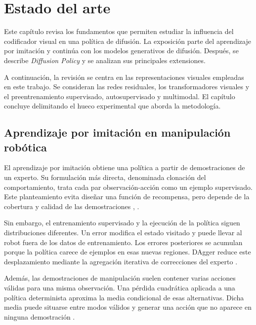 \chapter{Estado del arte}
\label{cap:estado-del-arte}

Este cap\'itulo revisa los fundamentos que permiten estudiar la influencia del
codificador visual en una pol\'itica de difusi\'on. La exposici\'on parte del
aprendizaje por imitaci\'on y contin\'ua con los modelos generativos de difusi\'on.
Despu\'es, se describe \textit{Diffusion Policy} y se analizan sus principales
extensiones.

A continuaci\'on, la revisi\'on se centra en las representaciones visuales empleadas
en este trabajo. Se consideran las redes residuales, los transformadores visuales y
el preentrenamiento supervisado, autosupervisado y multimodal. El cap\'itulo concluye
delimitando el hueco experimental que aborda la metodolog\'ia.

\section{Aprendizaje por imitaci\'on en manipulaci\'on rob\'otica}
\label{sec:imitacion}

El aprendizaje por imitaci\'on obtiene una pol\'itica a partir de demostraciones de un
experto. Su formulaci\'on m\'as directa, denominada clonaci\'on del comportamiento,
trata cada par observaci\'on-acci\'on como un ejemplo supervisado. Este planteamiento
evita dise\~nar una funci\'on de recompensa, pero depende de la cobertura y calidad de
las demostraciones \cite{ross2011dagger}, \cite{mandlekar2021robomimic}.

Sin embargo, el entrenamiento supervisado y la ejecuci\'on de la pol\'itica siguen
distribuciones diferentes. Un error modifica el estado visitado y puede llevar al
robot fuera de los datos de entrenamiento. Los errores posteriores se acumulan
porque la pol\'itica carece de ejemplos en esas nuevas regiones. DAgger reduce este
desplazamiento mediante la agregaci\'on iterativa de correcciones del experto
\cite{ross2011dagger}.

Adem\'as, las demostraciones de manipulaci\'on suelen contener varias acciones
v\'alidas para una misma observaci\'on. Una p\'erdida cuadr\'atica aplicada a una
pol\'itica determinista aproxima la media condicional de esas alternativas. Dicha
media puede situarse entre modos v\'alidos y generar una acci\'on que no aparece en
ninguna demostraci\'on \cite{florence2021ibc}.

